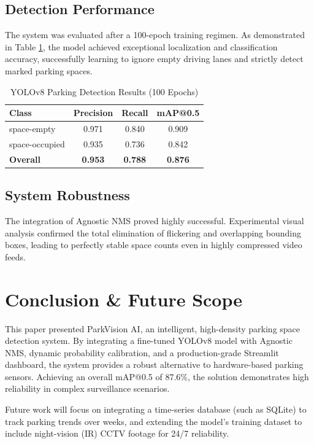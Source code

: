 \documentclass[conference]{IEEEtran}
\begin{document}
\subsection{Detection Performance}
The system was evaluated after a 100-epoch training regimen. As demonstrated in Table \ref{tab2}, the model achieved exceptional localization and classification accuracy, successfully learning to ignore empty driving lanes and strictly detect marked parking spaces.

\begin{table}[htbp]
\caption{YOLOv8 Parking Detection Results (100 Epochs)}
\begin{center}
\begin{tabular}{lccc}
\toprule
\textbf{Class} & \textbf{Precision} & \textbf{Recall} & \textbf{mAP@0.5} \\
\midrule
space-empty & 0.971 & 0.840 & 0.909 \\
space-occupied & 0.935 & 0.736 & 0.842 \\
\textbf{Overall} & \textbf{0.953} & \textbf{0.788} & \textbf{0.876} \\
\bottomrule
\end{tabular}
\label{tab2}
\end{center}
\end{table}

\subsection{System Robustness}
The integration of Agnostic NMS proved highly successful. Experimental visual analysis confirmed the total elimination of flickering and overlapping bounding boxes, leading to perfectly stable space counts even in highly compressed video feeds.

\section{Conclusion \& Future Scope}
This paper presented ParkVision AI, an intelligent, high-density parking space detection system. By integrating a fine-tuned YOLOv8 model with Agnostic NMS, dynamic probability calibration, and a production-grade Streamlit dashboard, the system provides a robust alternative to hardware-based parking sensors. Achieving an overall mAP@0.5 of 87.6\%, the solution demonstrates high reliability in complex surveillance scenarios.

Future work will focus on integrating a time-series database (such as SQLite) to track parking trends over weeks, and extending the model's training dataset to include night-vision (IR) CCTV footage for 24/7 reliability.
\end{document}
